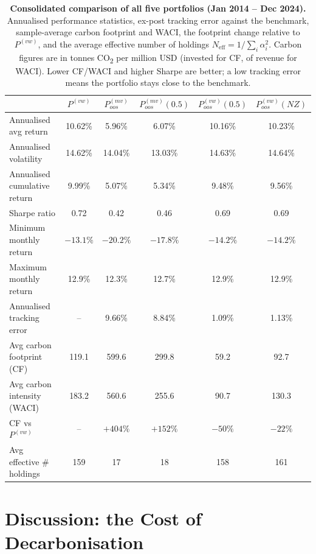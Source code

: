 \documentclass[11pt,a4paper]{article}
\newcommand{\pmv}{$P^{(mv)}_{oos}$}
\newcommand{\pvw}{$P^{(vw)}$}
\newcommand{\pmvh}{$P^{(mv)}_{oos}(0.5)$}
\newcommand{\pvwh}{$P^{(vw)}_{oos}(0.5)$}
\newcommand{\pnz}{$P^{(vw)}_{oos}(NZ)$}
\newcommand{\co}{CO\textsubscript{2}}
\begin{document}
\begin{table}[H]
\centering
\caption{\textbf{Consolidated comparison of all five portfolios
(Jan 2014 -- Dec 2024).} Annualised performance statistics, ex-post tracking
error against the benchmark, sample-average carbon footprint and WACI, the
footprint change relative to \pvw{}, and the average effective number of
holdings $N_{\text{eff}}=1/\sum_i\alpha_i^2$. Carbon figures are in tonnes \co{}
per million USD (invested for CF, of revenue for WACI). Lower CF/WACI and higher
Sharpe are better; a low tracking error means the portfolio stays close to the
benchmark.}
\label{tab:full}
\small
\renewcommand{\arraystretch}{1.15}
\begin{tabular}{lccccc}
\toprule
 & \pvw{} & \pmv{} & \pmvh{} & \pvwh{} & \pnz{}\\
\midrule
Annualised avg return        & 10.62\% & 5.96\%  & 6.07\%  & 10.16\% & 10.23\%\\
Annualised volatility        & 14.62\% & 14.04\% & 13.03\% & 14.63\% & 14.64\%\\
Annualised cumulative return & \phantom{0}9.99\% & 5.07\% & 5.34\% & \phantom{0}9.48\% & \phantom{0}9.56\%\\
Sharpe ratio                 & 0.72 & 0.42 & 0.46 & 0.69 & 0.69\\
Minimum monthly return       & $-13.1\%$ & $-20.2\%$ & $-17.8\%$ & $-14.2\%$ & $-14.2\%$\\
Maximum monthly return       & 12.9\% & 12.3\% & 12.7\% & 12.9\% & 12.9\%\\
Annualised tracking error    & --   & 9.66\% & 8.84\% & 1.09\% & 1.13\%\\
\midrule
Avg carbon footprint (CF)    & 119.1 & 599.6 & 299.8 & 59.2 & 92.7\\
Avg carbon intensity (WACI)  & 183.2 & 560.6 & 255.6 & 90.7 & 130.3\\
CF vs \pvw{}                 & --   & $+404\%$ & $+152\%$ & $-50\%$ & $-22\%$\\
Avg effective \# holdings    & 159 & 17 & 18 & 158 & 161\\
\bottomrule
\end{tabular}
\end{table}

\section{Discussion: the Cost of Decarbonisation}
\end{document}
